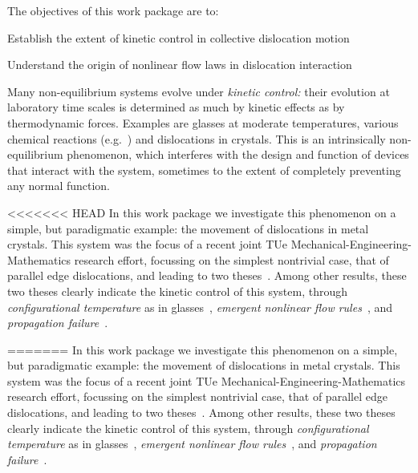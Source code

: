 \begin{workpackage}[id=WPkinetic,wphases=0-48,
short=Kin. control,
title=Kinetic control,
lead=TUE,
TUERM=24]

\begin{wpobjectives}
The objectives of this work package are to:
\begin{compactitem}
\item Establish the extent of kinetic control in collective dislocation motion
\item Understand the origin of nonlinear flow laws in dislocation interaction
\end{compactitem}
\end{wpobjectives}

\begin{wpdescription}
Many non-equilibrium systems evolve under \emph{kinetic control:} their evolution at
laboratory time scales is determined as much by kinetic effects as by thermodynamic
forces. Examples are glasses at moderate temperatures, various chemical reactions
(e.g.~\cite{Sykes}) and dislocations in crystals. This is an intrinsically non-equilibrium
phenomenon, which interferes with the design and function of devices that interact with the
system, sometimes to the extent of completely preventing any normal function.
  
<<<<<<< HEAD
  In this work package we investigate this phenomenon on a simple, but paradigmatic example: the movement of dislocations in metal crystals. This system was the focus of a recent joint TUe Mechanical-Engineering-Mathematics research effort, focussing on the simplest nontrivial case, that of parallel edge dislocations, and leading to two theses~\cite{VanMeurs15TH,Kooiman15TH}. Among other results, these two theses clearly indicate the kinetic control of this system, through \emph{configurational temperature} as in glasses~\cite[Ch.~2--4]{Kooiman15TH}, \emph{emergent nonlinear flow rules}~\cite[Ch.~6]{Kooiman15TH}, and \emph{propagation failure}~\cite[Ch.~9]{VanMeurs15TH}.
  
  
    
  
    
=======
In this work package we investigate this phenomenon on a simple, but paradigmatic example:
the movement of dislocations in metal crystals. This system was the focus of a recent joint
TUe Mechanical-Engineering-Mathematics research effort, focussing on the simplest nontrivial
case, that of parallel edge dislocations, and leading to two
theses~\cite{VanMeurs15TH,Kooiman15TH}. Among other results, these two theses clearly
indicate the kinetic control of this system, through \emph{configurational temperature} as
in glasses~\cite[Ch.~2--4]{Kooiman15TH}, \emph{emergent nonlinear flow
rules}~\cite[Ch.~6]{Kooiman15TH}, and \emph{propagation
failure}~\cite[Ch.~9]{VanMeurs15TH}.


\end{wpdescription}
\end{workpackage}
